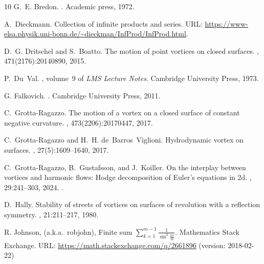 \documentclass[11pt,twoside]{article}
\theoremstyle{definition}
\numberwithin{equation}{section}
\begin{document}
\begin{thebibliography}{10}
G.~E. Bredon.
.
\newblock Academic press, 1972.

A.~Dieckmann.
\newblock Collection of infinite products and series.
\newblock URL: \url{https://www-elsa.physik.uni-bonn.de/~dieckman/InfProd/InfProd.html}.

D.~G. Dritschel and S.~Boatto.
\newblock The motion of point vortices on closed surfaces.
, 471(2176):20140890, 2015.

P.~Du~Val.
, volume~9 of {\em LMS Lecture Notes}.
\newblock Cambridge University Press, 1973.

G. Falkovich.
.
\newblock Cambridge University Press, 2011.

C.~Grotta-Ragazzo.
\newblock The motion of a vortex on a closed surface of constant negative curvature.
, 473(2206):20170447, 2017.

C.~Grotta-Ragazzo and H.~H. de~Barros~Viglioni.
\newblock Hydrodynamic vortex on surfaces.
, 27(5):1609--1640, 2017.

C.~Grotta-Ragazzo, B.~Gustafsson, and J.~Koiller.
\newblock On the interplay between vortices and harmonic flows: {H}odge decomposition of {E}uler’s equations in 2d.
, 29:241--303, 2024.
\newblock \href {https://doi.org/10.1134/S1560354724020011} {}.

D.~Hally.
\newblock Stability of streets of vortices on surfaces of revolution with a reﬂection symmetry.
, 21:211--217, 1980.

R. Johnson,  (a.k.a.\ robjohn), %
\newblock Finite sum $\sum\limits_{k=1}^{m-1}\frac{1}{\sin^2\frac{k\pi}{m}}$.
\newblock Mathematics Stack Exchange.
\newblock URL: \url{https://math.stackexchange.com/q/2661896} (version: 2018-02-22)%



\end{thebibliography}
\end{document}
